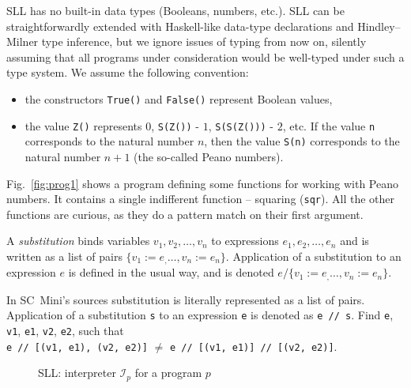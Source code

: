SLL has no built-in data types (Booleans, numbers, etc.). 
SLL can be straightforwardly extended with Haskell-like data-type
declarations and Hindley–Milner type inference, but we ignore
issues of typing from now on, silently assuming that all
programs under consideration would be well-typed
under such a type system.
We assume the following convention:
\begin{itemize}
  \item the constructors \texttt{True()} and \texttt{False()} represent Boolean values,
  \item the value \texttt{Z()} represents $0$, \texttt{S(Z())} - $1$, \texttt{S(S(Z()))} - $2$, etc. 
    If the value \texttt{n} corresponds to the natural number $n$, then the value \texttt{S(n)}
	corresponds to the natural number $n+1$ (the so-called Peano numbers).
\end{itemize}

Fig.~\ref{fig:prog1} shows a program defining some functions for working
with Peano numbers.
It contains a single indifferent function -- squaring (\texttt{sqr}).
All the other functions are curious, as they do a pattern match on their first argument.

A \emph{substitution} binds variables $v_1, v_2, \ldots, v_n$ to expressions $e_1, e_2, \ldots, e_n$ 
and is written as a list of pairs $\{v_1:=e_, \ldots, v_n := e_n\}$.
Application of a substitution to an expression $e$ is defined in the usual way, and 
is denoted $e / \{v_1:=e_, \ldots, v_n := e_n\}$.

\begin{exercise}
In SC~Mini's sources substitution is literally represented as a list of pairs.
Application of a substitution \texttt{s} to an expression \texttt{e} is denoted as \texttt{e~//~s}.
Find \texttt{e}, \texttt{v1}, \texttt{e1}, \texttt{v2}, \texttt{e2}, such that
\\ \texttt{e // [(v1, e1), (v2, e2)]} $\not =$ \texttt{e // [(v1, e1)] // [(v2, e2)]}.
\end{exercise}


\begin{figure}[t!]
\caption{SLL: interpreter $\mathcal{I}_p$ for a program $p$}

\label{fig-sll-semantics}
\end{figure}

